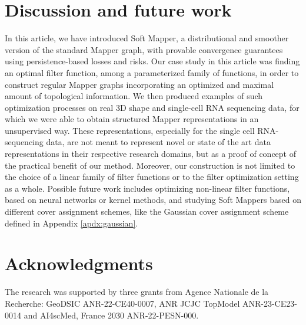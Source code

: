 \section{Discussion and future work} \label{sec:discussion}
In this article, we have introduced Soft Mapper, a distributional and smoother version of the standard Mapper graph, with provable convergence guarantees using persistence-based losses and risks. Our case study in this article was finding an optimal filter function, among a parameterized family of functions, in order to construct regular Mapper graphs incorporating an optimized and maximal amount of topological information. 
We then produced examples of such optimization processes on real 3D shape and single-cell RNA sequencing data, for which we were able to obtain structured Mapper representations in an unsupervised way.
These representations, especially for the single cell RNA-sequencing data, are not meant to represent novel or state of the art data representations in their respective research domains, but as a proof of concept of the practical benefit of our method.
Moreover, our construction is not limited to the choice of a linear family of filter functions or to the filter optimization setting as a whole. Possible future work includes optimizing non-linear filter functions, based on neural networks or kernel methods, and studying Soft Mappers based on different cover assignment schemes, like the Gaussian cover assignment scheme defined in Appendix \ref{apdx:gaussian}. 

\section{Acknowledgments}

The research was supported by three grants from Agence Nationale de la Recherche: GeoDSIC ANR-22-CE40-0007, ANR JCJC TopModel ANR-23-CE23-0014 and AI4scMed, France 2030 ANR-22-PESN-000. 

